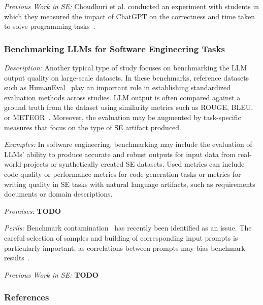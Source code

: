 \documentclass[11pt]{article}
\begin{document}
\emph{Previous Work in SE:}  Choudhuri et al. conducted an experiment with students in which they measured the impact of ChatGPT on the correctness and time taken to solve programming tasks~\cite{DBLP:conf/icse/ChoudhuriLSGS24}.


\subsubsection{Benchmarking LLMs for Software Engineering Tasks}

\emph{Description:}  Another typical type of study focuses on benchmarking the LLM output quality on large-scale datasets. In these benchmarks, reference datasets such as HumanEval~\cite{DBLP:journals/corr/abs-2107-03374} play an important role in establishing standardized evaluation methods across studies. LLM output is often compared against a ground truth from the dataset using similarity metrics such as ROUGE, BLEU, or METEOR~\cite{10.1145/3695988}.
Moreover, the evaluation may be augmented by task-specific measures that focus on the type of SE artifact produced.

\emph{Examples:} In software engineering, benchmarking may include the evaluation of LLMs' ability to produce accurate and robust outputs for input data from real-world projects or synthetically created SE datasets.
Used metrics can include code quality or performance metrics for code generation tasks or metrics for writing quality in SE tasks with natural language artifacts, such as requirements documents or domain descriptions.

\emph{Promises:} \textbf{TODO}

\emph{Perils:} Benchmark contamination~\cite{DBLP:journals/corr/abs-2410-16186} has recently been identified as an issue.
The careful selection of samples and building of corresponding input prompts is particularly important, as correlations between prompts may bias benchmark results~\cite{DBLP:conf/acl/SiskaMAB24}.

\emph{Previous Work in SE:} \textbf{TODO}

\subsubsection{References}



\end{document}
